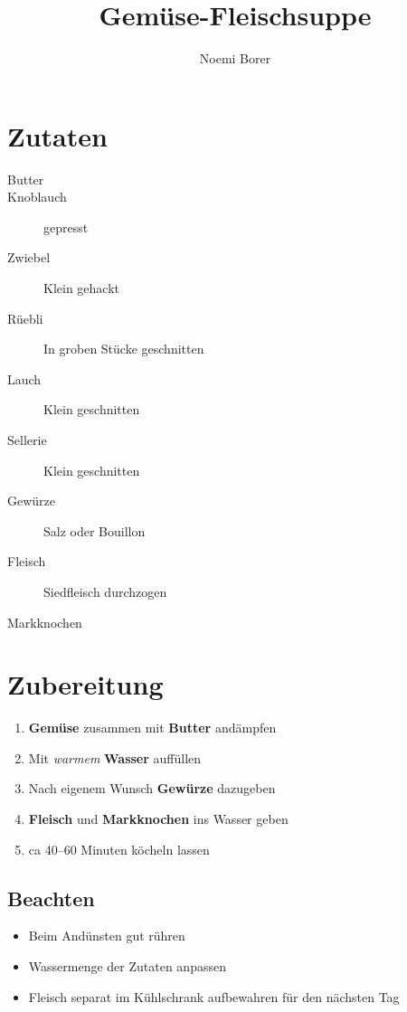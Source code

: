 \documentclass[]{scrartcl}
\title{Gemüse-Fleischsuppe}
\author{Noemi Borer}
\newcommand{\zutat}[1]{\textbf{#1}}
\begin{document}
\maketitle

\section*{Zutaten}
\begin{description}
	\item [Butter]
	\item [Knoblauch] gepresst
	\item [Zwiebel] Klein gehackt
	\item [Rüebli] In groben Stücke geschnitten
	\item [Lauch] Klein geschnitten
	\item [Sellerie] Klein geschnitten
	\item [Gewürze] Salz oder Bouillon
	\item [Fleisch] Siedfleisch durchzogen
	\item [Markknochen]
	
\end{description}
\section*{Zubereitung}
	\begin{enumerate}
		\item \zutat{Gemüse} zusammen mit \zutat{Butter} andämpfen
		\item Mit \emph{warmem} \zutat{Wasser} auffüllen
		\item Nach eigenem Wunsch \zutat{Gewürze} dazugeben
		\item \zutat{Fleisch} und \zutat{Markknochen} ins Wasser geben
		\item ca 40--60 Minuten köcheln lassen
	\end{enumerate}
\subsection*{Beachten}
\begin{itemize}
\item Beim Andünsten gut rühren 
\item Wassermenge der Zutaten anpassen
\item Fleisch separat im Kühlschrank aufbewahren für den nächsten Tag
\end{itemize}
\end{document}
